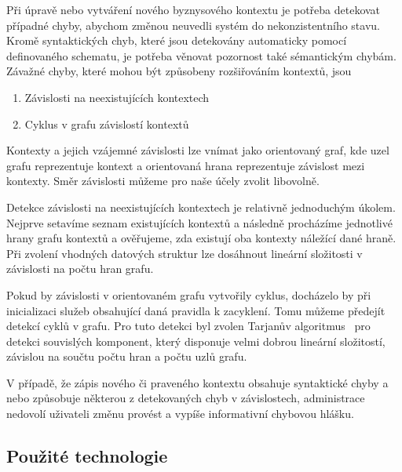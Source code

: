 Při úpravě nebo vytváření nového byznysového kontextu je
potřeba detekovat případné chyby, abychom změnou neuvedli
systém do nekonzistentního stavu. Kromě syntaktických chyb,
které jsou detekovány automaticky pomocí definovaného schematu,
je potřeba věnovat pozornost také sémantickým chybám.
Závažné chyby, které mohou být způsobeny rozšiřováním kontextů, jsou
\begin{enumerate}[label=\alph*)]
    \item Závislosti na neexistujících kontextech
    \item Cyklus v grafu závislostí kontextů
\end{enumerate}

Kontexty a jejich vzájemné závislosti lze vnímat jako
orientovaný graf, kde uzel grafu reprezentuje kontext
a orientovaná hrana reprezentuje závislost mezi kontexty.
Směr závislosti můžeme pro naše účely zvolit libovolně.

Detekce závislosti na neexistujících kontextech je relativně
jednoduchým úkolem. Nejprve setavíme seznam existujících kontextů
a následně procházíme jednotlivé hrany grafu kontextů a ověřujeme,
zda existují oba kontexty náležící dané hraně.
Při zvolení vhodných datových struktur lze dosáhnout
lineární složitosti v závislosti na počtu hran grafu.

Pokud by závislosti v orientovaném grafu vytvořily cyklus,
docházelo by při inicializaci služeb
obsahující daná pravidla k zacyklení. Tomu můžeme předejít
detekcí cyklů v grafu. Pro tuto detekci byl zvolen
Tarjanův algoritmus~\cite{tarjan1971depth} pro detekci souvislých
komponent, který disponuje velmi dobrou lineární složitostí,
závislou na součtu počtu hran a počtu uzlů grafu.

V případě, že zápis nového či praveného kontextu obsahuje syntaktické
chyby a nebo způsobuje některou z detekovaných chyb v závislostech,
administrace nedovolí uživateli změnu provést a vypíše informativní
chybovou hlášku.

\subsection{Použité technologie}


